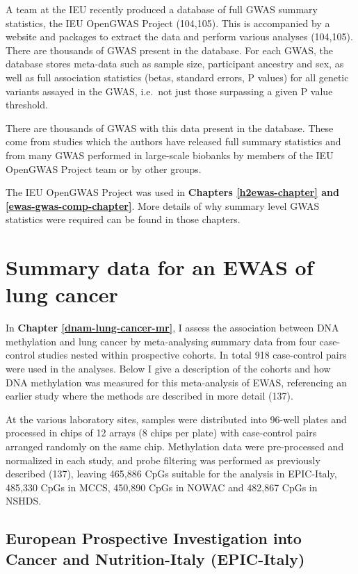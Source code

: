\documentclass[11pt,twoside]{bristolthesis}
\begin{document}
A team at the IEU recently produced a database of full GWAS summary statistics, the IEU OpenGWAS Project (104,105). This is accompanied by a website and packages to extract the data and perform various analyses (104,105). There are thousands of GWAS present in the database. For each GWAS, the database stores meta-data such as sample size, participant ancestry and sex, as well as full association statistics (betas, standard errors, P values) for all genetic variants assayed in the GWAS, i.e.~not just those surpassing a given P value threshold.

There are thousands of GWAS with this data present in the database. These come from studies which the authors have released full summary statistics and from many GWAS performed in large-scale biobanks by members of the IEU OpenGWAS Project team or by other groups.

The IEU OpenGWAS Project was used in \textbf{Chapters \ref{h2ewas-chapter} and \ref{ewas-gwas-comp-chapter}}. More details of why summary level GWAS statistics were required can be found in those chapters.

\hypertarget{lc-ewas-data}{%
\section{Summary data for an EWAS of lung cancer}\label{lc-ewas-data}}

In \textbf{Chapter \ref{dnam-lung-cancer-mr}}, I assess the association between DNA methylation and lung cancer by meta-analysing summary data from four case-control studies nested within prospective cohorts. In total 918 case-control pairs were used in the analyses. Below I give a description of the cohorts and how DNA methylation was measured for this meta-analysis of EWAS, referencing an earlier study where the methods are described in more detail (137).

At the various laboratory sites, samples were distributed into 96-well plates and processed in chips of 12 arrays (8 chips per plate) with case-control pairs arranged randomly on the same chip. Methylation data were pre-processed and normalized in each study, and probe filtering was performed as previously described (137), leaving 465,886 CpGs suitable for the analysis in EPIC-Italy, 485,330 CpGs in MCCS, 450,890 CpGs in NOWAC and 482,867 CpGs in NSHDS.

\hypertarget{epic-italy}{%
\subsection{European Prospective Investigation into Cancer and Nutrition-Italy (EPIC-Italy)}\label{epic-italy}}
\end{document}
